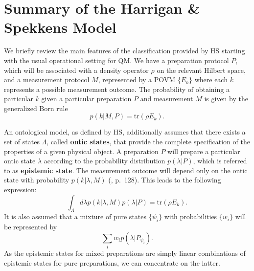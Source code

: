 \documentclass[twocolumn,prl,floatfix,superscriptaddress]{revtex4-2}
\begin{document}
\section{Summary of the Harrigan \& Spekkens Model}

We briefly review the main features of the classification provided by HS starting with the usual operational setting for QM. We have a preparation protocol $P$, which will be associated with a density operator $\rho$ on the relevant Hilbert space, and a measurement protocol $M$, represented by a POVM $\{ E_k\}$ where each $k$ represents a possible measurement outcome. The probability of obtaining a particular $k$ given a particular preparation $P$ and measurement $M$ is given by the generalized Born rule
\begin{equation}
	p(k|M, P)=\textrm{tr}(\rho E_k).
\end{equation}

An ontological model, as defined by HS, additionally assumes that there exists a set of states $\Lambda$, called \textbf{ontic states}, that provide the complete specification of the properties of a given physical object. A preparation $P$ will prepare a particular ontic state $\lambda$ according to the probability distribution $p(\lambda | P)$, which is referred to as \textbf{epistemic state}. The measurement outcome will depend only on the ontic state with probability $p(k|\lambda, M)$ (\cite{Harrigan:2010}, p.\ 128). This leads to the following expression:
\begin{equation}
	\int_\Lambda d\lambda p(k|\lambda, M) p(\lambda| P)= \textrm{tr}(\rho E_k).
\end{equation}
It is also assumed that a mixture of pure states $\{ \psi_i \}$ with probabilities $\{ w_i \}$ will be represented by
\begin{equation}\label{epistemic_mixing}
	\sum_i  w_i p(\lambda| P_{\psi_i}).
\end{equation}
As the epistemic states for mixed preparations are simply linear combinations of epistemic states for pure preparations, we can concentrate on the latter.
\end{document}
